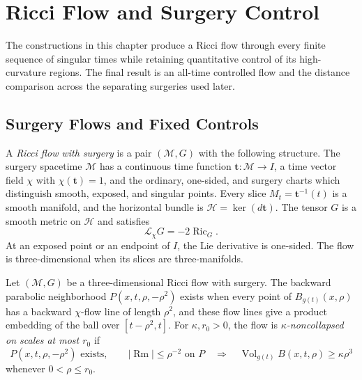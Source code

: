 \chapter{Ricci Flow and Surgery Control}

The constructions in this chapter produce a Ricci flow through every finite
sequence of singular times while retaining quantitative control of its
high-curvature regions.  The final result is an all-time controlled flow and
the distance comparison across the separating surgeries used later.

\section{Surgery Flows and Fixed Controls}

\begin{definition}
\label{def:ricci-flow-with-surgery}
\notready
A \emph{Ricci flow with surgery} is a pair $(\mathcal M,G)$ with the
following structure.  The surgery spacetime $\mathcal M$ has a continuous
time function $\mathbf t\colon\mathcal M\to I$, a time vector field $\chi$
with $\chi(\mathbf t)=1$, and the ordinary, one-sided, and surgery charts
which distinguish smooth, exposed, and singular points.  Every slice
$M_t=\mathbf t^{-1}(t)$ is a smooth manifold, and the horizontal bundle is
$\mathcal H=\ker(d\mathbf t)$.  The tensor $G$ is a smooth metric on
$\mathcal H$ and satisfies
\[
 \mathcal L_\chi G=-2\operatorname{Ric}_G.
\]
At an exposed point or an endpoint of $I$, the Lie derivative is one-sided.
The flow is three-dimensional when its slices are three-manifolds.
\end{definition}

\begin{definition}
\label{def:surgery-flow-noncollapsing}
\notready
Let $(\mathcal M,G)$ be a three-dimensional Ricci flow with surgery.  The
backward parabolic neighborhood $P(x,t,\rho,-\rho^2)$ exists when every
point of $B_{g(t)}(x,\rho)$ has a backward $\chi$-flow line of length
$\rho^2$, and these flow lines give a product embedding of the ball over
$[t-\rho^2,t]$.  For $\kappa,r_0>0$, the flow is
\emph{$\kappa$-noncollapsed on scales at most $r_0$} if
\[
 P(x,t,\rho,-\rho^2)\text{ exists},\qquad
 |\operatorname{Rm}|\le \rho^{-2}\text{ on }P
 \quad\Longrightarrow\quad
 \operatorname{Vol}_{g(t)}B(x,t,\rho)\ge\kappa\rho^3
\]
whenever $0<\rho\le r_0$.
\end{definition}

